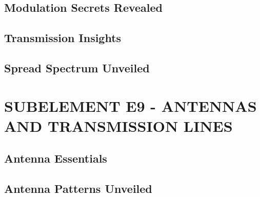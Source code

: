 \documentclass[12pt]{book}
\begin{document}
\section{Modulation Secrets Revealed}











\section{Transmission Insights}















\section{Spread Spectrum Unveiled}











\chapter{SUBELEMENT E9 - ANTENNAS AND TRANSMISSION LINES}
\section{Antenna Essentials}












\section{Antenna Patterns Unveiled}











\end{document}
